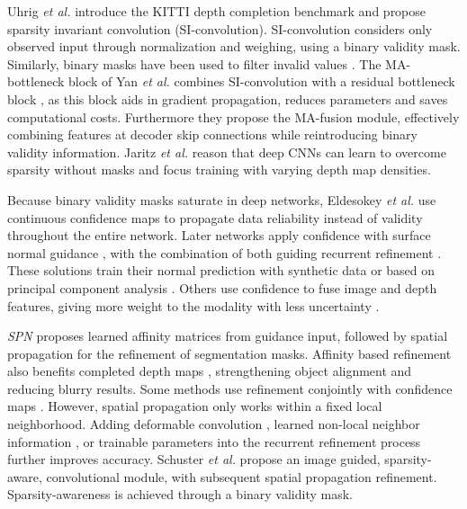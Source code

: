 \documentclass[letterpaper, 10 pt, conference]{ieeeconf}  \usepackage{geometry}
\begin{document}
Uhrig \textit{et al.} \cite{uhrig2017sparsity} introduce the KITTI depth completion benchmark and propose sparsity invariant convolution (SI-convolution). SI-convolution considers only observed input through  normalization and weighing, using a binary validity mask. Similarly, binary masks have been used to filter invalid values \cite{ADNN}. The MA-bottleneck block of Yan \textit{et al.} \cite{Revisiting_Sparsity} combines SI-convolution with a residual bottleneck block \cite{ResBottleneck}, as this block aids in gradient propagation, reduces parameters and saves computational costs. Furthermore they propose the MA-fusion module, effectively combining features at decoder skip connections while reintroducing binary validity information. Jaritz \textit{et al.} \cite{Sparse_Training_Spade} reason that deep CNNs can learn to overcome sparsity without masks and focus training with varying depth map densities.

Because binary validity masks saturate in deep networks, Eldesokey \textit{et al.} \cite{Confidence_Original, Confidence_L2} use continuous confidence maps to propagate data reliability instead of validity throughout the entire network. Later networks apply confidence with surface normal guidance \cite{DeepLidar_synthdata}, with the combination of both guiding recurrent refinement \cite{PWP}. These solutions train their normal prediction with synthetic data \cite{DeepLidar_synthdata} or based on principal component analysis \cite{PWP}. Others use confidence to fuse image and depth features, giving more weight to the modality with less uncertainty \cite{Sparse_Uncertain,CrossGuidance,GraphConv}.

\textit{SPN} \cite{SPN_Affinity} proposes learned affinity matrices from guidance input, followed by spatial propagation for the refinement of segmentation masks. Affinity based refinement also benefits  completed depth maps \cite{CSPN}, strengthening object alignment and reducing blurry results. Some methods use refinement conjointly with confidence maps \cite{DefSPN,CSPN++,PE_Net}. However, spatial propagation only works within a fixed local neighborhood. Adding deformable convolution \cite{DefSPN}, learned non-local neighbor information \cite{NL_spatialprop}, or trainable parameters into the recurrent refinement process \cite{CSPN++} further improves accuracy. Schuster \textit{et al.} \cite{SSGP_Wasenmueller} propose an image guided, sparsity-aware, convolutional module, with subsequent spatial propagation refinement. Sparsity-awareness is achieved through a binary validity mask.
\end{document}
